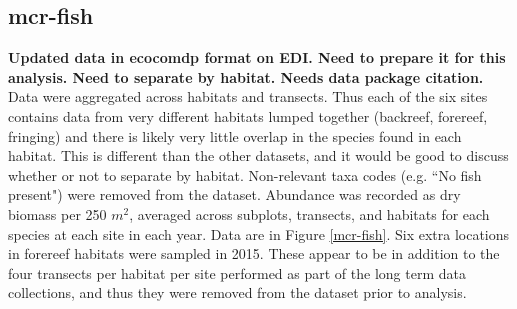 \documentclass[11pt, oneside]{article}
\begin{document}
\subsection {mcr-fish}
{\bf Updated data in ecocomdp format on EDI. Need to prepare it for this analysis. Need to separate by habitat. Needs data package citation.}
Data were aggregated across habitats and transects.
Thus each of the six sites contains data from very different habitats lumped together (backreef, forereef, fringing) and there is likely very little overlap in the species found in each habitat. 
This is different than the other datasets, and it would be good to discuss whether or not to separate by habitat.
Non-relevant taxa codes (e.g. ``No fish present") were removed from the dataset.
Abundance was recorded as dry biomass per 250 $m^2$, averaged across subplots, transects, and habitats for each species at each site in each year.
Data are in Figure \ref{mcr-fish}.
Six extra locations in forereef habitats were sampled in 2015.
These appear to be in addition to the four transects per habitat per site performed as part of the long term data collections, and thus they were removed from the dataset prior to analysis.
\end{document}
